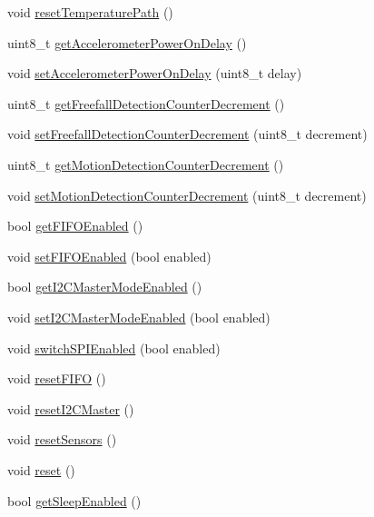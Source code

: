 \begin{DoxyCompactItemize}
\item 
void \hyperlink{class_m_p_u6050_a559c2d091d36a4e0489bc639916ddbb6}{reset\+Temperature\+Path} ()
\item 
uint8\+\_\+t \hyperlink{class_m_p_u6050_aae903df2accc687423f9cd0a78f9cd32}{get\+Accelerometer\+Power\+On\+Delay} ()
\item 
void \hyperlink{class_m_p_u6050_a2bbde7653d2d2d37e16e515599f3b08b}{set\+Accelerometer\+Power\+On\+Delay} (uint8\+\_\+t delay)
\item 
uint8\+\_\+t \hyperlink{class_m_p_u6050_af6d6fa9869636989a8b29c4827ad7de8}{get\+Freefall\+Detection\+Counter\+Decrement} ()
\item 
void \hyperlink{class_m_p_u6050_a18dd79b7c53600e9ce97eed4bfe6cf15}{set\+Freefall\+Detection\+Counter\+Decrement} (uint8\+\_\+t decrement)
\item 
uint8\+\_\+t \hyperlink{class_m_p_u6050_a0ed8de8eb440dbfdec829297527b0da6}{get\+Motion\+Detection\+Counter\+Decrement} ()
\item 
void \hyperlink{class_m_p_u6050_a74cc3ea727afa5d4406175085e60d08c}{set\+Motion\+Detection\+Counter\+Decrement} (uint8\+\_\+t decrement)
\item 
bool \hyperlink{class_m_p_u6050_ae2687a09ebe0d7fbbf74f560e0dd9a44}{get\+F\+I\+F\+O\+Enabled} ()
\item 
void \hyperlink{class_m_p_u6050_a78e58ab27986db6999af775ed4d43091}{set\+F\+I\+F\+O\+Enabled} (bool enabled)
\item 
bool \hyperlink{class_m_p_u6050_a6b45e538f2082eb1b1975ed56e3e21bc}{get\+I2\+C\+Master\+Mode\+Enabled} ()
\item 
void \hyperlink{class_m_p_u6050_a6503f0fdfefa0fd287a75032667b7b69}{set\+I2\+C\+Master\+Mode\+Enabled} (bool enabled)
\item 
void \hyperlink{class_m_p_u6050_a269710b7bca814bbf67e7bb38c381650}{switch\+S\+P\+I\+Enabled} (bool enabled)
\item 
void \hyperlink{class_m_p_u6050_aafa0dc38b7ea2acd1aecd5d9df8cbd08}{reset\+F\+I\+F\+O} ()
\item 
void \hyperlink{class_m_p_u6050_a96332c394f1b7efd44c83a4ff690e732}{reset\+I2\+C\+Master} ()
\item 
void \hyperlink{class_m_p_u6050_a9a271104d3302abc4af005c69a930094}{reset\+Sensors} ()
\item 
void \hyperlink{class_m_p_u6050_a7100b6d276c3c8664cf00d768b7b0dee}{reset} ()
\item 
bool \hyperlink{class_m_p_u6050_a196404ef04b959083d4bf5e6f1cd8b98}{get\+Sleep\+Enabled} ()

\end{DoxyCompactItemize}
